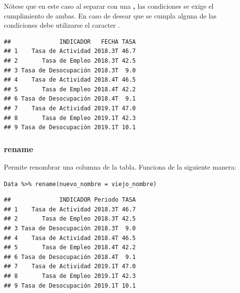 \documentclass[]{book}
\newenvironment{Shaded}{\begin{snugshade}}{\end{snugshade}}
\newcommand{\DataTypeTok}[1]{\textcolor[rgb]{0.13,0.29,0.53}{#1}}
\newcommand{\DecValTok}[1]{\textcolor[rgb]{0.00,0.00,0.81}{#1}}
\newcommand{\KeywordTok}[1]{\textcolor[rgb]{0.13,0.29,0.53}{\textbf{#1}}}
\newcommand{\NormalTok}[1]{#1}
\newcommand{\OperatorTok}[1]{\textcolor[rgb]{0.81,0.36,0.00}{\textbf{#1}}}
\newcommand{\StringTok}[1]{\textcolor[rgb]{0.31,0.60,0.02}{#1}}
\begin{document}
Nótese que en este caso al separar con una \textbf{,} las condiciones se exige el cumplimiento de ambas. En caso de desear que se cumpla alguna de las condiciones debe utilizarse el caracter \textbf{\textbar{}}.

\begin{Shaded}
\end{Shaded}

\begin{verbatim}
##              INDICADOR   FECHA TASA
## 1    Tasa de Actividad 2018.3T 46.7
## 2       Tasa de Empleo 2018.3T 42.5
## 3 Tasa de Desocupación 2018.3T  9.0
## 4    Tasa de Actividad 2018.4T 46.5
## 5       Tasa de Empleo 2018.4T 42.2
## 6 Tasa de Desocupación 2018.4T  9.1
## 7    Tasa de Actividad 2019.1T 47.0
## 8       Tasa de Empleo 2019.1T 42.3
## 9 Tasa de Desocupación 2019.1T 10.1
\end{verbatim}

\hypertarget{rename}{%
\subsubsection{rename}\label{rename}}

Permite renombrar una columna de la tabla. Funciona de la siguiente manera:

\texttt{Data\ \%\textgreater{}\%\ rename(nuevo\_nombre\ =\ viejo\_nombre)}

\begin{Shaded}
\end{Shaded}

\begin{verbatim}
##              INDICADOR Periodo TASA
## 1    Tasa de Actividad 2018.3T 46.7
## 2       Tasa de Empleo 2018.3T 42.5
## 3 Tasa de Desocupación 2018.3T  9.0
## 4    Tasa de Actividad 2018.4T 46.5
## 5       Tasa de Empleo 2018.4T 42.2
## 6 Tasa de Desocupación 2018.4T  9.1
## 7    Tasa de Actividad 2019.1T 47.0
## 8       Tasa de Empleo 2019.1T 42.3
## 9 Tasa de Desocupación 2019.1T 10.1
\end{verbatim}
\end{document}
